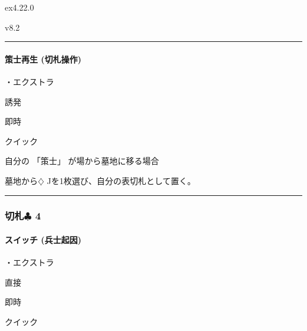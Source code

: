 \documentclass[letterpaper,10pt,dvipdfmx]{sphinxmanual}
\begin{document}
\sphinxAtStartPar
{}  ex4.22.0

\sphinxAtStartPar
{}  v8.2


\bigskip\hrule\bigskip



\paragraph{策士再生 (切札操作)}
\label{\detokenize{auto/frameActionlist:act-strategistrevive}}\label{\detokenize{auto/frameActionlist:id71}}
\sphinxAtStartPar
{}

\sphinxAtStartPar
・エクストラ

\sphinxAtStartPar
{} 誘発

\sphinxAtStartPar
{} 即時

\sphinxAtStartPar
{} クイック

\sphinxAtStartPar
{}

\sphinxAtStartPar
自分の 「策士」 が場から墓地に移る場合

\sphinxAtStartPar
{}

\sphinxAtStartPar
墓地から{\normalsize $\diamondsuit$} Jを1枚選び、自分の表切札として置く。


\bigskip\hrule\bigskip



\subsubsection{切札{\normalsize $\clubsuit$} 4}
\label{\detokenize{auto/frameActionlist:id72}}

\paragraph{スイッチ (兵士起因)}
\label{\detokenize{auto/frameActionlist:act-switch}}\label{\detokenize{auto/frameActionlist:id73}}
\sphinxAtStartPar
{}

\sphinxAtStartPar
・エクストラ

\sphinxAtStartPar
{} 直接

\sphinxAtStartPar
{} 即時

\sphinxAtStartPar
{} クイック
\end{document}
